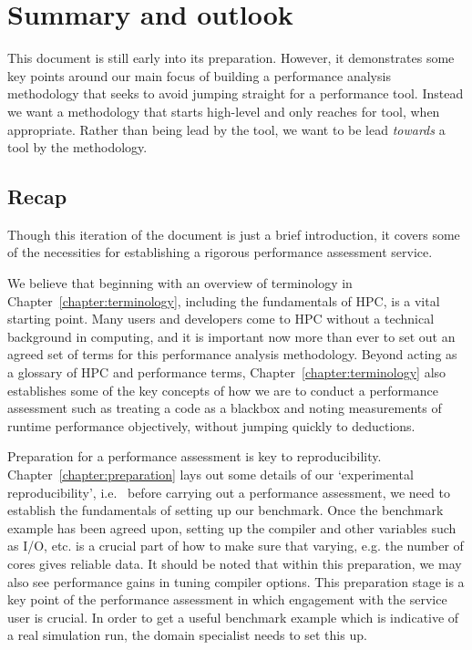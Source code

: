 \chapter{Summary and outlook}\label{chapter:summary}
This document is still early into its preparation. However, it demonstrates some key points around our main focus of building a performance analysis methodology that seeks to avoid jumping straight for a performance tool. Instead we want a methodology that starts high-level and only reaches for tool, when appropriate. Rather than being lead by the tool, we want to be lead \emph{towards} a tool by the methodology.



\section{Recap}
Though this iteration of the document is just a brief introduction, it covers some of the necessities for establishing a rigorous performance assessment service. 

We believe that beginning with an overview of terminology in Chapter~\ref{chapter:terminology}, including the fundamentals of HPC, is a vital starting point. Many users and developers come to HPC without a technical background in computing, and it is important now more than ever to set out an agreed set of terms for this performance analysis methodology. Beyond acting as a glossary of HPC and performance terms, Chapter~\ref{chapter:terminology} also establishes some of the key concepts of how we are to conduct a performance assessment such as treating a code as a blackbox and noting measurements of runtime performance objectively, without jumping quickly to deductions.

Preparation for a performance assessment is key to reproducibility. Chapter~\ref{chapter:preparation} lays out some details of our `experimental reproducibility', i.e.~ before carrying out a performance assessment, we need to establish the fundamentals of setting up our benchmark. Once the benchmark example has been agreed upon, setting up the compiler and other variables such as I/O, etc. is a crucial part of how to make sure that varying, e.g. the number of cores gives reliable data. It should be noted that within this preparation, we may also see performance gains in tuning compiler options. This preparation stage is a key point of the performance assessment in which engagement with the service user is crucial. In order to get a useful benchmark example which is indicative of a real simulation run, the domain specialist needs to set this up.

